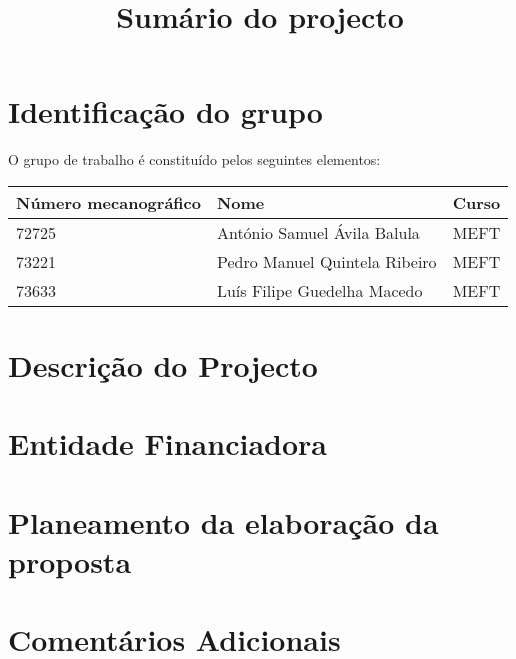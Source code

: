\documentclass[%
	nofootinbib,
	amsmath,amssymb,
	aps,
	12pt,
	a4paper
]{article}
\begin{document}


\title{Sumário do projecto}
\date{}
\maketitle


\section{Identificação do grupo}
O grupo de trabalho é constituído pelos seguintes elementos:

\begin{center}
	\begin{tabular}{lll}
		Número mecanográfico	&Nome			&Curso	\\ \hline
		72725					&António Samuel Ávila Balula	&MEFT	\\
		73221					&Pedro Manuel Quintela Ribeiro	&MEFT	\\
		73633					&Luís Filipe Guedelha Macedo 	&MEFT	\\
	\end{tabular}
\end{center}

\section{Descrição do Projecto}
\section{Entidade Financiadora}
\section{Planeamento da elaboração da proposta}
\section{Comentários Adicionais}




\nocite{*}
{}
\end{document}
